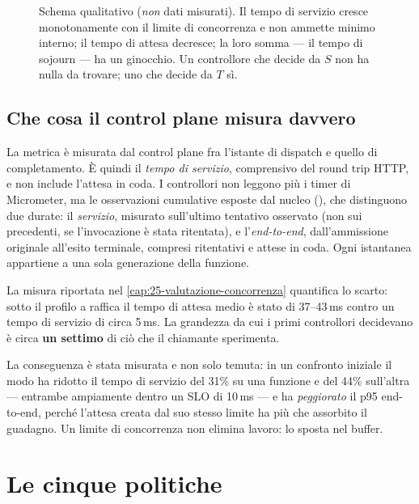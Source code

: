 \begin{figure}[htbp]
  \centering
  \resizebox{0.85\textwidth}{!}{}
  \caption{Schema qualitativo (\emph{non} dati misurati). Il tempo di servizio
  cresce monotonamente con il limite di concorrenza e non ammette minimo interno;
  il tempo di attesa decresce; la loro somma --- il tempo di sojourn --- ha un
  ginocchio. Un controllore che decide da $S$ non ha nulla da trovare; uno che
  decide da $T$ s\`i.}
  \label{fig:sojourn}
\end{figure}

\subsection{Che cosa il control plane misura davvero}

La metrica  \`e misurata dal control plane fra
l'istante di dispatch e quello di completamento. \`E quindi il \emph{tempo di
servizio}, comprensivo del round trip HTTP, e non include l'attesa in coda.
I controllori non leggono pi\`u i timer di Micrometer, ma le osservazioni
cumulative esposte dal nucleo (), che distinguono
due durate: il \emph{servizio}, misurato sull'ultimo tentativo osservato (non sui
precedenti, se l'invocazione \`e stata ritentata), e l'\emph{end-to-end}, dall'ammissione
originale all'esito terminale, compresi ritentativi e attese in coda. Ogni
istantanea appartiene a una sola generazione della funzione.

La misura riportata nel \cref{cap:25-valutazione-concorrenza} quantifica lo
scarto: sotto il profilo a raffica il tempo di attesa medio \`e stato di
37--43\,ms contro un tempo di servizio di circa 5\,ms. La grandezza da cui i
primi controllori decidevano \`e circa \textbf{un settimo} di ci\`o che il
chiamante sperimenta.

La conseguenza \`e stata misurata e non solo temuta: in un confronto iniziale il
modo  ha ridotto il tempo di servizio del 31\% su una funzione e
del 44\% sull'altra --- entrambe ampiamente dentro un SLO di 10\,ms --- e ha
\emph{peggiorato} il p95 end-to-end, perch\'e l'attesa creata dal suo stesso
limite ha pi\`u che assorbito il guadagno. Un limite di concorrenza non elimina
lavoro: lo sposta nel buffer.

\section{Le cinque politiche}

